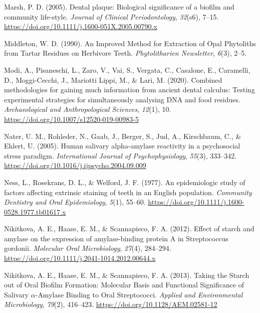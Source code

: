 \documentclass[
  b5paper,
]{book}
\newlength{\cslhangindent}
\newenvironment{CSLReferences}[2] %
 {\begin{list}{}{%
  \setlength{\itemindent}{0pt}
  \setlength{\leftmargin}{0pt}
  \setlength{\parsep}{0pt}
  \ifodd #1
   \setlength{\leftmargin}{\cslhangindent}
   \setlength{\itemindent}{-1\cslhangindent}
  \fi
  \setlength{\itemsep}{#2\baselineskip}}}
 {\end{list}}
\begin{document}
\begin{CSLReferences}{1}{0}
Marsh, P. D. (2005). Dental plaque: Biological significance of a biofilm
and community life-style. \emph{Journal of Clinical Periodontology},
\emph{32}(s6), 7--15.
\url{https://doi.org/10.1111/j.1600-051X.2005.00790.x}

Middleton, W. D. (1990). An {Improved Method} for {Extraction} of {Opal
Phytoliths} from {Tartar Residues} on {Herbivore Teeth}.
\emph{Phytolitharien Newsletter}, \emph{6}(3), 2--5.

Modi, A., Pisaneschi, L., Zaro, V., Vai, S., Vergata, C., Casalone, E.,
Caramelli, D., Moggi-Cecchi, J., Mariotti Lippi, M., \& Lari, M. (2020).
Combined methodologies for gaining much information from ancient dental
calculus: Testing experimental strategies for simultaneously analysing
{DNA} and food residues. \emph{Archaeological and Anthropological
Sciences}, \emph{12}(1), 10.
\url{https://doi.org/10.1007/s12520-019-00983-5}

Nater, U. M., Rohleder, N., Gaab, J., Berger, S., Jud, A., Kirschbaum,
C., \& Ehlert, U. (2005). Human salivary alpha-amylase reactivity in a
psychosocial stress paradigm. \emph{International Journal of
Psychophysiology}, \emph{55}(3), 333--342.
\url{https://doi.org/10.1016/j.ijpsycho.2004.09.009}

Ness, L., Rosekrans, D. L., \& Welford, J. F. (1977). An epidemiologic
study of factors affecting extrinsic staining of teeth in an {English}
population. \emph{Community Dentistry and Oral Epidemiology},
\emph{5}(1), 55--60.
\url{https://doi.org/10.1111/j.1600-0528.1977.tb01617.x}

Nikitkova, A. E., Haase, E. M., \& Scannapieco, F. A. (2012). Effect of
starch and amylase on the expression of amylase-binding protein {A} in
{Streptococcus} gordonii. \emph{Molecular Oral Microbiology},
\emph{27}(4), 284--294.
\url{https://doi.org/10.1111/j.2041-1014.2012.00644.x}

Nikitkova, A. E., Haase, E. M., \& Scannapieco, F. A. (2013). Taking the
{Starch} out of {Oral Biofilm Formation}: {Molecular Basis} and
{Functional Significance} of {Salivary} {\(\alpha\)}-{Amylase Binding}
to {Oral Streptococci}. \emph{Applied and Environmental Microbiology},
\emph{79}(2), 416--423. \url{https://doi.org/10.1128/AEM.02581-12}


\end{CSLReferences}
\end{document}
